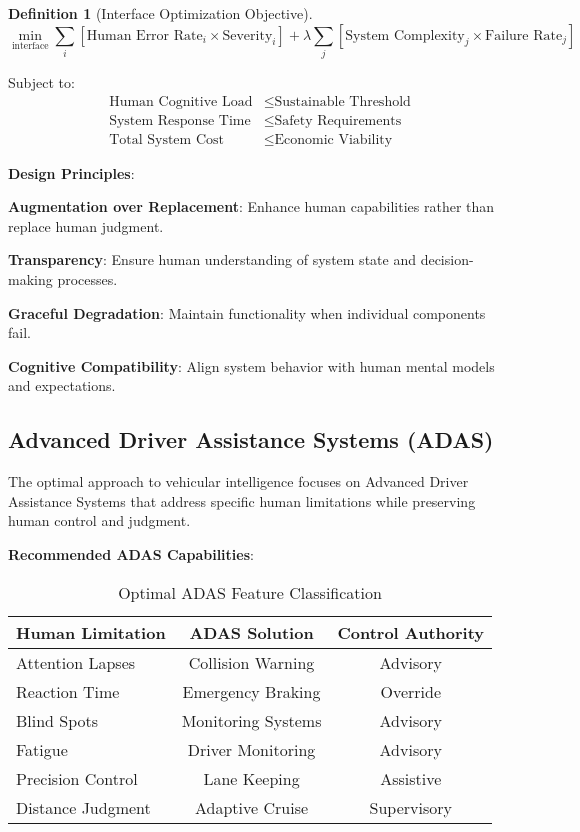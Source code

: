 \documentclass[12pt,a4paper]{article}
\newtheorem{definition}[theorem]{Definition}
\begin{document}
\begin{definition}[Interface Optimization Objective]
$$\min_{\text{interface}} \sum_{i} [\text{Human Error Rate}_i \times \text{Severity}_i] + \lambda \sum_{j} [\text{System Complexity}_j \times \text{Failure Rate}_j]$$
\end{definition}

Subject to:
\begin{align}
\text{Human Cognitive Load} &\leq \text{Sustainable Threshold}\\
\text{System Response Time} &\leq \text{Safety Requirements}\\
\text{Total System Cost} &\leq \text{Economic Viability}
\end{align}

\textbf{Design Principles}:

\textbf{Augmentation over Replacement}: Enhance human capabilities rather than replace human judgment.

\textbf{Transparency}: Ensure human understanding of system state and decision-making processes.

\textbf{Graceful Degradation}: Maintain functionality when individual components fail.

\textbf{Cognitive Compatibility}: Align system behavior with human mental models and expectations.

\subsection{Advanced Driver Assistance Systems (ADAS)}

The optimal approach to vehicular intelligence focuses on Advanced Driver Assistance Systems that address specific human limitations while preserving human control and judgment.

\textbf{Recommended ADAS Capabilities}:

\begin{table}[h]
\centering
\caption{Optimal ADAS Feature Classification}
\begin{tabular}{lcc}
\toprule
\textbf{Human Limitation} & \textbf{ADAS Solution} & \textbf{Control Authority} \\
\midrule
Attention Lapses & Collision Warning & Advisory \\
Reaction Time & Emergency Braking & Override \\
Blind Spots & Monitoring Systems & Advisory \\
Fatigue & Driver Monitoring & Advisory \\
Precision Control & Lane Keeping & Assistive \\
Distance Judgment & Adaptive Cruise & Supervisory \\
\bottomrule
\end{tabular}
\label{tab:adas_features}
\end{table}
\end{document}
